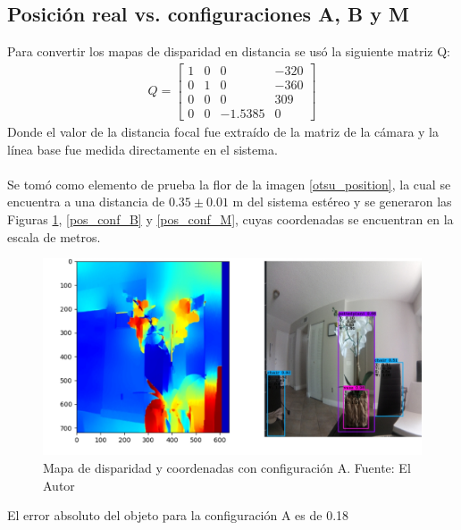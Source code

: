 \subsection{Posición real vs. configuraciones A, B y M}
Para convertir los mapas de disparidad en distancia se usó la siguiente matriz Q:
\begin{align}
    Q = \begin{bmatrix}
            1 & 0 & 0 & -320\\
            0 & 1 & 0 & -360\\
            0 & 0 & 0 & 309\\
            0 & 0 & -1.5385 & 0
            \end{bmatrix}
\end{align}
Donde el valor de la distancia focal fue extraído de la matriz de la cámara y la línea base fue medida directamente en el sistema.
\\
\\
Se tomó como elemento de prueba la flor de la imagen \ref{otsu_position}, la cual se encuentra a una distancia de $0.35 \pm 0.01$ m del sistema estéreo y se generaron las Figuras \ref{pos_conf_A}, \ref{pos_conf_B} y \ref{pos_conf_M}, cuyas coordenadas se encuentran en la escala de metros.
\begin{figure}[H]
    \centering
    \includegraphics[scale=0.5]{Recursos/position_configuration_A.jpg}
    \caption[Mapa de disparidad y coordenadas con configuración A.]{Mapa de disparidad y coordenadas con configuración A. {\footnotesize Fuente: El Autor}}
    \label{pos_conf_A}
\end{figure}
El error absoluto del objeto para la configuración A es de 0.18

